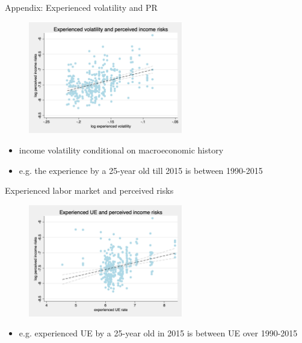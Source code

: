 \documentclass{beamer}
\begin{document}
\begin{frame}{Appendix: Experienced volatility and PR}
	\label{appendix:experience}
	\begin{figure}
		\centering 
		\label{experience_var_var_var}
		\includegraphics[width=0.6\textwidth]{figures/experience_var_var_data.png}
	\end{figure}
	\begin{itemize}
		\item income volatility conditional on macroeconomic history \cite{storesletten2004cyclical}
		\item e.g. the experience by a 25-year old till 2015 is between 1990-2015
	\end{itemize}
\end{frame}

\begin{frame}{Experienced labor market and perceived risks}
	\begin{figure}
		\centering 
		\label{experience_ue_var}
		\includegraphics[width=0.6\textwidth]{figures/experience_ue_var_data.png}
	\end{figure}
	\begin{itemize}
		\item e.g. experienced UE by a 25-year old in 2015 is between UE over 1990-2015
		
	\end{itemize}
\end{frame}
\end{document}
